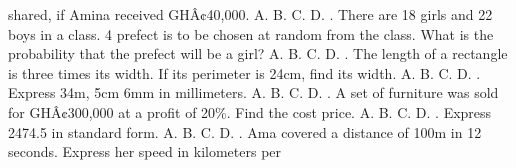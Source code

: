\documentclass{article}
\begin{document}
\begin{multicols}{2}
shared, if Amina received GHÂ¢40,000. \newline \indent A. \newline \indent B. \newline \indent C. \newline \indent D.  \newline{}. There are 18 girls and 22 boys in a class. 4 prefect is to be chosen at random from the class. What is the probability that the prefect will be a girl? \newline \indent A. \newline \indent B. \newline \indent C. \newline \indent D.  \newline{}. The length of a rectangle is three times its width. If its perimeter is 24cm, find its width. \newline \indent A. \newline \indent B. \newline \indent C. \newline \indent D.  \newline{}. Express 34m, 5cm 6mm in millimeters. \newline \indent A. \newline \indent B. \newline \indent C. \newline \indent D.  \newline{}. A set of furniture was sold for GHÂ¢300,000 at a profit of 20\%. Find the cost price. \newline \indent A. \newline \indent B. \newline \indent C. \newline \indent D.  \newline{}. Express 2474.5 in standard form. \newline \indent A. \newline \indent B. \newline \indent C. \newline \indent D.  \newline{}. Ama covered a distance of 100m in 12 seconds. Express her speed in kilometers per 
\end{multicols}
\end{document}
